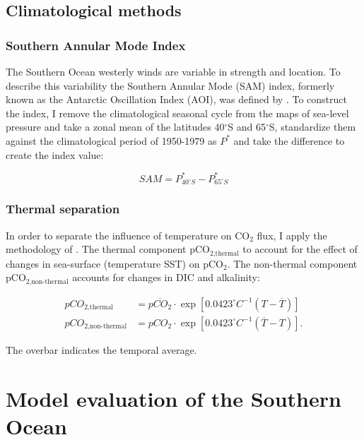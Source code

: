 \documentclass[12pt]{article}
\begin{document}
\subsection{Climatological methods}

\subsubsection{Southern Annular Mode Index}
\label{sec:sam}
The Southern Ocean westerly winds are variable in strength and location. To describe this variability the Southern Annular Mode (SAM) index, formerly known as the Antarctic Oscillation Index (AOI), was defined by \cite{Gong1999}. To construct the index, I remove the climatological seasonal cycle from the maps of sea-level pressure and take a zonal mean of the latitudes 40$^\circ$S and 65$^\circ$S, standardize them against the climatological period of 1950-1979 as $P^*$ and take the difference to create the index value:

\[ SAM={P}^*_{40^{\circ}S} - {P}^*_{65^{\circ}S}\] 

\subsubsection{Thermal separation}
\label{sec:takahashi}
In order to separate the influence of temperature on CO$_2$ flux, I apply the methodology of \cite{Takahashi1993,Takahashi2002}. The thermal component pCO$_{\text{2,thermal}}$ to account for the effect of changes in sea-surface (temperature SST) on pCO$_2$. The non-thermal component pCO$_{\text{2,non-thermal}}$ accounts for changes in DIC and alkalinity:

\begin{align*}
pCO_{\text{2,thermal}}&=\overline{pCO_2} \cdot \exp \left[ 0.0423 ^{\circ}C^{-1}\left( T - \overline{T} \right) \right] \\
pCO_{\text{2,non-thermal}}&=pCO_2 \cdot \exp \left[ 0.0423 ^{\circ}C^{-1}\left( \overline{T} - T \right) \right].
\end{align*}

The overbar indicates the temporal average.

\clearpage

\section{Model evaluation of the Southern Ocean}

\label{ch:eval}
\end{document}
